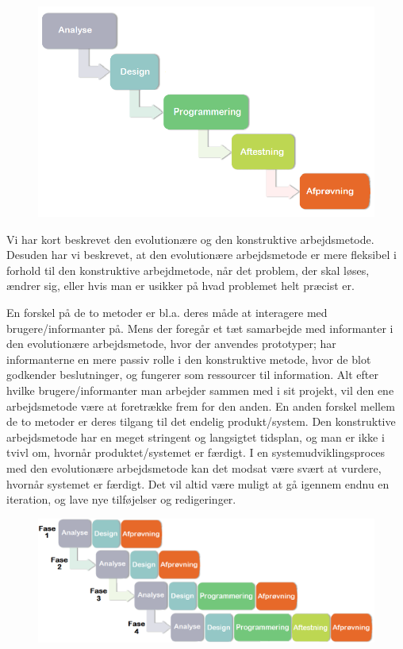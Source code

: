 \begin{figure}[ht]
	\centering
	\includegraphics[scale=0.5]{billeder/konstruktivemetode.png}
  	\label{fig:konstruktivemetode}
\end{figure}

Vi har kort beskrevet den evolutionære og den konstruktive arbejdsmetode. Desuden har vi beskrevet, at den evolutionære arbejdsmetode er mere fleksibel i forhold til den konstruktive arbejdmetode, når det problem, der skal løses, ændrer sig, eller hvis man er usikker på hvad problemet helt præcist er.

En forskel på de to metoder er bl.a. deres måde at interagere med brugere/informanter på. Mens der foregår et tæt samarbejde med informanter i den evolutionære arbejdsmetode, hvor der anvendes prototyper; har informanterne en mere passiv rolle i den konstruktive metode, hvor de blot godkender beslutninger, og fungerer som ressourcer til information. Alt efter hvilke brugere/informanter man arbejder sammen med i sit projekt, vil den ene arbejdsmetode være at foretrække frem for den anden. En anden forskel mellem de to metoder er deres tilgang til det endelig produkt/system. Den konstruktive arbejdsmetode har en meget stringent og langsigtet tidsplan, og man er ikke i tvivl om, hvornår produktet/systemet er færdigt. I en systemudviklingsproces med den evolutionære arbejdsmetode kan det modsat være svært at vurdere,  hvornår systemet er færdigt. Det vil altid være muligt at gå igennem endnu en iteration, og lave nye tilføjelser og redigeringer.

\begin{figure}[ht]
	\centering
	\includegraphics[scale=0.5]{billeder/blandingsmetode.png}
  	\label{fig:blandingsmetode}
\end{figure}

